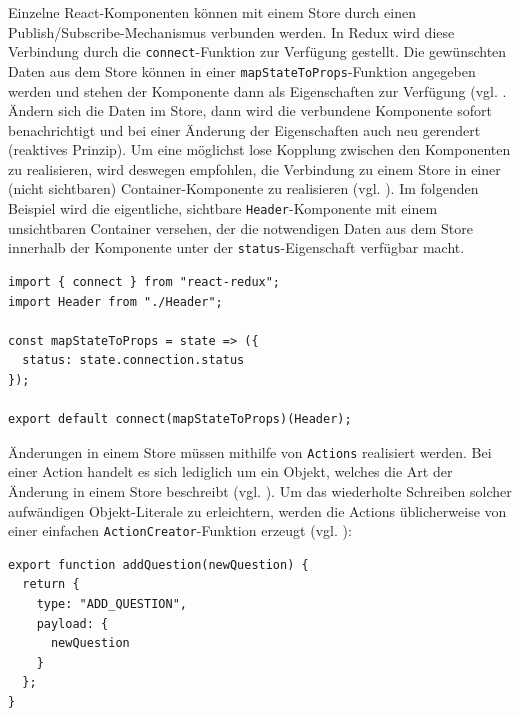 Einzelne React-Komponenten können mit einem Store durch einen Publish/Subscribe-Mechanismus verbunden werden. In Redux wird diese Verbindung durch die \texttt{connect}-Funktion zur Verfügung gestellt. Die gewünschten Daten aus dem Store können in einer \texttt{mapStateToProps}-Funktion angegeben werden und stehen der Komponente dann als Eigenschaften zur Verfügung (vgl. \cite[Abschnitt „Implementing Container Components“]{web:redux_react}. Ändern sich die Daten im Store, dann wird die verbundene Komponente sofort benachrichtigt und bei einer Änderung der Eigenschaften auch neu gerendert (reaktives Prinzip). Um eine möglichst lose Kopplung zwischen den Komponenten zu realisieren, wird deswegen empfohlen, die Verbindung zu einem Store in einer (nicht sichtbaren) Container-Komponente zu realisieren (vgl. \cite[Abschnitt „Presentational and Container Components“]{web:redux_react}). Im folgenden Beispiel wird die eigentliche, sichtbare \texttt{Header}-Komponente mit einem unsichtbaren Container versehen, der die notwendigen Daten aus dem Store innerhalb der Komponente unter der \texttt{status}-Eigenschaft verfügbar macht.

\begin{minipage}{\linewidth}
\begin{lstlisting}[caption={Über den connect-Aufruf beim Exportieren der Komponente wird sie mit dem Store verbunden. (aus:  src/client/components/ClientHeaderContainer.js)}]
import { connect } from "react-redux";
import Header from "./Header";

const mapStateToProps = state => ({
  status: state.connection.status
});

export default connect(mapStateToProps)(Header);
\end{lstlisting}
\end{minipage}

Änderungen in einem Store müssen mithilfe von \texttt{Actions} realisiert werden. Bei einer Action handelt es sich lediglich um ein Objekt, welches die Art der Änderung in einem Store beschreibt (vgl. \cite[Abschnitt „Actions“]{web:redux_actions}). Um das wiederholte Schreiben solcher aufwändigen Objekt-Literale zu erleichtern, werden die Actions üblicherweise von einer einfachen \texttt{ActionCreator}-Funktion erzeugt (vgl. \cite[Abschnitt „Action Creators“]{web:redux_actions}):

\begin{minipage}{\linewidth}
\begin{lstlisting}[caption={Ein Action-Objekt ist lediglich die Beschreibung einer Änderungsoperation und wird in einem ActionCreator erzeugt.}]
export function addQuestion(newQuestion) {
  return {
    type: "ADD_QUESTION",
    payload: {
      newQuestion
    }
  };
}
\end{lstlisting}
\end{minipage}

